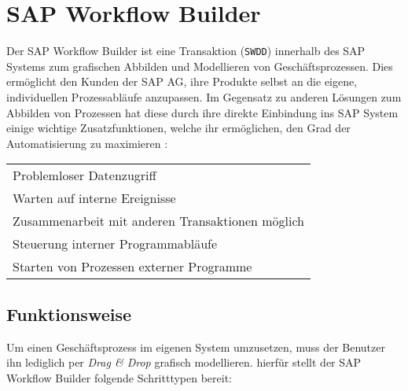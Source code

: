 \documentclass{handout}
\begin{document}
\section{SAP Workflow Builder}
Der SAP Workflow Builder ist eine Transaktion (\texttt{SWDD}) innerhalb des SAP Systems zum grafischen Abbilden und Modellieren von Geschäftsprozessen. Dies ermöglicht den Kunden der SAP AG, ihre Produkte selbst an die eigene, individuellen Prozessabläufe anzupassen. Im Gegensatz zu anderen Lösungen zum Abbilden von Prozessen hat diese durch ihre direkte Einbindung ins SAP System einige wichtige Zusatzfunktionen, welche ihr ermöglichen, den Grad der Automatisierung zu maximieren \cite{SAPHelpWf}:

\small
\begin{tabular}{L}
Problemloser Datenzugriff\\
Warten auf interne Ereignisse\\
Zusammenarbeit mit anderen Transaktionen möglich\\
Steuerung interner Programmabläufe\\
Starten von Prozessen externer Programme
\end{tabular}
\normalsize

\subsection{Funktionsweise}
Um einen Geschäftsprozess im eigenen System umzusetzen, muss der Benutzer ihn lediglich per \textit{Drag \& Drop} grafisch modellieren. hierfür stellt der SAP Workflow Builder folgende Schritttypen bereit:
\end{document}
